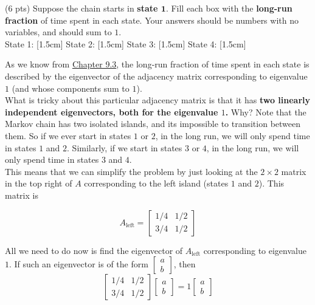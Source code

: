 \documentclass[11pt]{article}
\begin{document}
\begin{prob}[(14 pts)]
\begin{subprob}(6 pts) Suppose the chain starts in \textbf{state $\mathbf{1}$}. Fill each box with the \textbf{long-run fraction} of time spent in each state. Your answers should be numbers with no variables, and should sum to $1$. \\

State 1: [1.5cm] \quad State 2: [1.5cm] \quad State 3: [1.5cm] \quad State 4: [1.5cm]

\begin{solution}
As we know from \href{https://notes.eecs245.org/eigenvalues-and-eigenvectors/markov-chains-adjacency-matrices/}{Chapter 9.3}, the long-run fraction of time spent in each state is described by the eigenvector of the adjacency matrix corresponding to eigenvalue $1$ (and whose components sum to $1$). \\

What is tricky about this particular adjacency matrix is that it has \textbf{two linearly independent eigenvectors, both for the eigenvalue $1$.} Why? Note that the Markov chain has two isolated islands, and its impossible to transition between them. So if we ever start in states $1$ or $2$, in the long run, we will only spend time in states $1$ and $2$. Similarly, if we start in states $3$ or $4$, in the long run, we will only spend time in states $3$ and $4$. \\

This means that we can simplify the problem by just looking at the $2 \times 2$ matrix in the top right of $A$ corresponding to the left island (states $1$ and $2$). This matrix is

$$A_{\text{left}} = \begin{bmatrix} 
1/4 & 1/2 \\
3/4 & 1/2
\end{bmatrix}
$$

All we need to do now is find the eigenvector of $A_{\text{left}}$ corresponding to eigenvalue $1$. If such an eigenvector is of the form $\begin{bmatrix} a \\ b \end{bmatrix}$, then
\[
\begin{bmatrix} 1/4 & 1/2 \\ 3/4 & 1/2 \end{bmatrix} \begin{bmatrix} a \\ b \end{bmatrix} = 1 \begin{bmatrix} a \\ b \end{bmatrix}
\]


\end{solution}
\end{subprob}
\end{prob}
\end{document}
